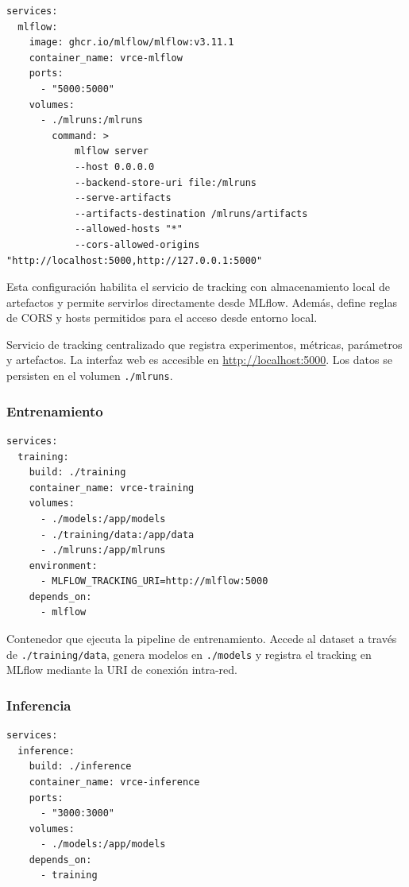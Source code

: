 \documentclass{ULBreport} %
\begin{document}
\begin{verbatim}
services:
  mlflow:
    image: ghcr.io/mlflow/mlflow:v3.11.1
    container_name: vrce-mlflow
    ports:
      - "5000:5000"
    volumes:
      - ./mlruns:/mlruns
        command: >
            mlflow server
            --host 0.0.0.0
            --backend-store-uri file:/mlruns
            --serve-artifacts
            --artifacts-destination /mlruns/artifacts
            --allowed-hosts "*"
            --cors-allowed-origins "http://localhost:5000,http://127.0.0.1:5000"
\end{verbatim}

Esta configuración habilita el servicio de tracking con almacenamiento local de artefactos y permite servirlos directamente desde MLflow. Además, define reglas de CORS y hosts permitidos para el acceso desde entorno local.

Servicio de tracking centralizado que registra experimentos, métricas, parámetros y artefactos. La interfaz web es accesible en \url{http://localhost:5000}. Los datos se persisten en el volumen \texttt{./mlruns}.

\subsubsection{Entrenamiento}

\begin{verbatim}
services:
  training:
    build: ./training
    container_name: vrce-training
    volumes:
      - ./models:/app/models
      - ./training/data:/app/data
      - ./mlruns:/app/mlruns
    environment:
      - MLFLOW_TRACKING_URI=http://mlflow:5000
    depends_on:
      - mlflow
\end{verbatim}

Contenedor que ejecuta la pipeline de entrenamiento. Accede al dataset a través de \texttt{./training/data}, genera modelos en \texttt{./models} y registra el tracking en MLflow mediante la URI de conexión intra-red.

\subsubsection{Inferencia}

\begin{verbatim}
services:
  inference:
    build: ./inference
    container_name: vrce-inference
    ports:
      - "3000:3000"
    volumes:
      - ./models:/app/models
    depends_on:
      - training
\end{verbatim}
\end{document}
